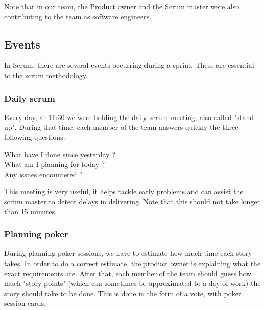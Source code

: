 Note that in our team, the Product owner and the Scrum master were also contributing to the team as software engineers.

\subsection{Events}
In Scrum, there are several events occurring during a sprint.
These are essential to the scrum methodology.

\subsubsection{Daily scrum}
Every day, at 11:30 we were holding the daily scrum meeting, also called "stand-up".
During that time, each member of the team answers quickly the three following questions:

\begin{description}
    \item[What have I done since yesterday ?]
    \item[What am I planning for today ?]
    \item[Any issues encountered ?]
\end{description}

This meeting is very useful, it helps tackle early problems and can assist the scrum master to detect delays in delivering.
Note that this should not take longer than 15 minutes.


\subsubsection{Planning poker}
During planning poker sessions, we have to estimate how much time each story takes. In order to do a correct estimate,
the product owner is explaining what the exact requirements are. After that, each member of the team should guess
how much "story points" (which can sometimes be approximated to a day of work) the story should take to be done.
This is done in the form of a vote, with poker session cards.

